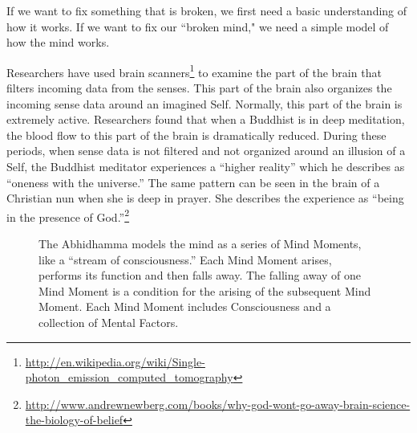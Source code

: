 If we want to fix something that is broken, we first need a basic understanding of how it works. If we want to fix our ``broken mind," we need a simple model of how the mind works.

\pagebreak

Researchers have used brain scanners\footnote{\url{http://en.wikipedia.org/wiki/Single-photon_emission_computed_tomography}} to examine the part of the brain that filters incoming data from the senses. This part of the brain also organizes the incoming sense data around an imagined Self. Normally, this part of the brain is extremely active. Researchers found that when a Buddhist is in deep meditation, the blood flow to this part of the brain is dramatically reduced. During these periods, when sense data is not filtered and not organized around an illusion of a Self, the Buddhist meditator experiences a “higher reality” which he describes as “oneness with the universe.” The same pattern can be seen in the brain of a Christian nun when she is deep in prayer. She describes the experience as “being in the presence of God.”\footnote{\url{http://www.andrewnewberg.com/books/why-god-wont-go-away-brain-science-the-biology-of-belief}}

\begin{figure}[H]
\centering

\caption[The Abhidhamma models the mind as a series of Mind Moments, like a “stream of consciousness.” Each Mind Moment arises, performs its function and then falls away. The falling away of one Mind Moment is a condition for the arising of the subsequent Mind Moment. Each Mind Moment includes Consciousness and a collection of Mental Factors.]{The Abhidhamma models the mind as a series of Mind Moments, like a “stream of consciousness.” Each Mind Moment arises, performs its function and then falls away. The falling away of one Mind Moment is a condition for the arising of the subsequent Mind Moment. Each Mind Moment includes Consciousness and a collection of Mental Factors.\footnotemark}
\label{fig:Model}
\end{figure}


